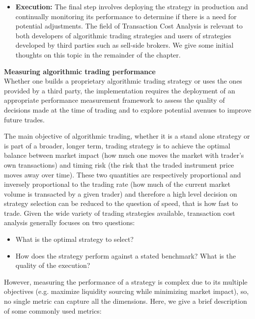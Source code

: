 \begin{itemize}
\item \textbf{Execution:} The final step involves deploying the strategy in production and continually monitoring its performance to determine if there is a need for potential adjustments. The field of Transaction Cost Analysis is relevant to both developers of algorithmic trading strategies and users of strategies developed by third parties such as sell-side brokers. We give some initial thoughts on this topic in the remainder of the chapter.
\end{itemize}

\noindent\textbf{Measuring algorithmic trading performance} \\

Whether one builds a proprietary algorithmic trading strategy or uses the ones provided by a third party, the implementation requires the deployment of an appropriate performance measurement framework to assess the quality of decisions made at the time of trading and to explore potential avenues to improve future trades.

The main objective of algorithmic trading, whether it is a stand alone strategy or is part of a broader, longer term, trading strategy is to achieve the optimal balance between market impact (how much one moves the market with trader's own transactions) and timing risk (the risk that the traded instrument price moves away over time). These two quantities are respectively proportional and inversely proportional to the trading rate (how much of the current market volume is transacted by a given trader) and therefore a high level decision on strategy selection can be reduced to the question of speed, that is how fast to trade. Given the wide variety of trading strategies available, transaction cost analysis generally focuses on two questions:
\begin{itemize}
\item What is the optimal strategy to select?
\item How does the strategy perform against a stated benchmark? What is the quality of the execution?
\end{itemize}

However, measuring the performance of a strategy is complex due to its multiple objectives (e.g. maximize liquidity sourcing while minimizing market impact), so, no single metric can capture all the dimensions. Here, we give a brief description of some commonly used metrics:

